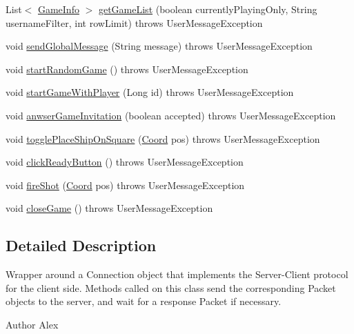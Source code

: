 \begin{DoxyCompactItemize}
\item 
List$<$ \hyperlink{classsharedlib_1_1tuples_1_1_game_info}{Game\+Info} $>$ \hyperlink{classclient_1_1conn_1_1_server_ab1f159361ca4682e87f2cea6224f094a}{get\+Game\+List} (boolean currently\+Playing\+Only, String username\+Filter, int row\+Limit)  throws User\+Message\+Exception 
\item 
void \hyperlink{classclient_1_1conn_1_1_server_acbe845e1fc6ba7857fcf6d01377f5432}{send\+Global\+Message} (String message)  throws User\+Message\+Exception 
\item 
void \hyperlink{classclient_1_1conn_1_1_server_afbeea330d5f40a6edd87387fa71bcc2d}{start\+Random\+Game} ()  throws User\+Message\+Exception 
\item 
void \hyperlink{classclient_1_1conn_1_1_server_a6336de53822bd12d42e8445a598f2838}{start\+Game\+With\+Player} (Long id)  throws User\+Message\+Exception 
\item 
void \hyperlink{classclient_1_1conn_1_1_server_a28692c894a8055b95dd493fbaec8b567}{anwser\+Game\+Invitation} (boolean accepted)  throws User\+Message\+Exception 
\item 
void \hyperlink{classclient_1_1conn_1_1_server_a9894c54137e6f203dd38a47fe3514c27}{toggle\+Place\+Ship\+On\+Square} (\hyperlink{classsharedlib_1_1utils_1_1_coord}{Coord} pos)  throws User\+Message\+Exception 
\item 
void \hyperlink{classclient_1_1conn_1_1_server_a7e54680c0fb053bee969c41f093aa5c4}{click\+Ready\+Button} ()  throws User\+Message\+Exception 
\item 
void \hyperlink{classclient_1_1conn_1_1_server_ab1d2fa19e855a803efff54edd2113d83}{fire\+Shot} (\hyperlink{classsharedlib_1_1utils_1_1_coord}{Coord} pos)  throws User\+Message\+Exception 
\item 
void \hyperlink{classclient_1_1conn_1_1_server_a5d1f1961306d3e06c895abc90dfddf9f}{close\+Game} ()  throws User\+Message\+Exception 
\end{DoxyCompactItemize}


\subsection{Detailed Description}
Wrapper around a Connection object that implements the Server-\/\+Client protocol for the client side. Methods called on this class send the corresponding {\ttfamily Packet} objects to the server, and wait for a response {\ttfamily Packet} if necessary. \begin{DoxyAuthor}{Author}
Alex 
\end{DoxyAuthor}


